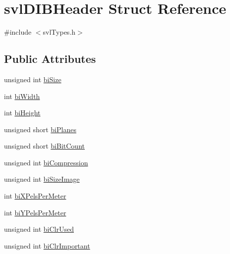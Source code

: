 \hypertarget{structsvl_d_i_b_header}{\section{svl\-D\-I\-B\-Header Struct Reference}
\label{structsvl_d_i_b_header}
}


{\ttfamily \#include $<$svl\-Types.\-h$>$}

\subsection*{Public Attributes}
\begin{DoxyCompactItemize}
\item 
unsigned int \hyperlink{structsvl_d_i_b_header_a5e0fed239ff25a4907c0f7323a0038a3}{bi\-Size}
\item 
int \hyperlink{structsvl_d_i_b_header_a3297bdf6492272cb1e19e98794c65cdd}{bi\-Width}
\item 
int \hyperlink{structsvl_d_i_b_header_a80fbfb83bb1befd16f14fd4b41a00c1a}{bi\-Height}
\item 
unsigned short \hyperlink{structsvl_d_i_b_header_ae5d7459ee8a98645740c173a962b378d}{bi\-Planes}
\item 
unsigned short \hyperlink{structsvl_d_i_b_header_a87b1b61efce80e91fd3d481d1c1c4651}{bi\-Bit\-Count}
\item 
unsigned int \hyperlink{structsvl_d_i_b_header_a7388ea79988ca642d73801593ff24f14}{bi\-Compression}
\item 
unsigned int \hyperlink{structsvl_d_i_b_header_a157a9a2b36641c574ef0b99033c41f69}{bi\-Size\-Image}
\item 
int \hyperlink{structsvl_d_i_b_header_a395be28cc1949a72a08fbea783c9b4d9}{bi\-X\-Pels\-Per\-Meter}
\item 
int \hyperlink{structsvl_d_i_b_header_a9a1b75645d1f907fd4ee74041273d48b}{bi\-Y\-Pels\-Per\-Meter}
\item 
unsigned int \hyperlink{structsvl_d_i_b_header_a7054e9748d123a59d12fad55199a5fc5}{bi\-Clr\-Used}
\item 
unsigned int \hyperlink{structsvl_d_i_b_header_afd4f21f7bda819d5bb360efcdc93769b}{bi\-Clr\-Important}
\end{DoxyCompactItemize}


